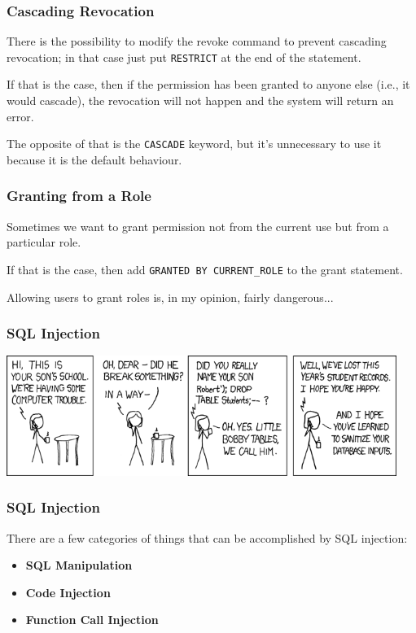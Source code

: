 \begin{frame}
\frametitle{Cascading Revocation}

There is the possibility to modify the revoke command to prevent cascading revocation; in that case just put \texttt{RESTRICT} at the end of the statement. 

If that is the case, then if the permission has been granted to anyone else (i.e., it would cascade), the revocation will not happen and the system will return an error.

The opposite of that is the \texttt{CASCADE} keyword, but it's unnecessary to use it because it is the default behaviour.

\end{frame}




\begin{frame}
\frametitle{Granting from a Role}

Sometimes we want to grant permission not from the current use but from a particular role.

 If that is the case, then add \texttt{GRANTED BY CURRENT\_ROLE} to the grant statement. 

Allowing users to grant roles is, in my opinion, fairly dangerous...

\end{frame}



\begin{frame}
\frametitle{SQL Injection}


\begin{center}
\includegraphics[width=0.95\textwidth]{images/exploits_of_a_mom}
\end{center}

\end{frame}



\begin{frame}
\frametitle{SQL Injection}

There are a few categories of things that can be accomplished by SQL injection:

\begin{itemize}
	\item \textbf{SQL Manipulation}
	\item \textbf{Code Injection}
	\item \textbf{Function Call Injection}
\end{itemize}

\end{frame}


